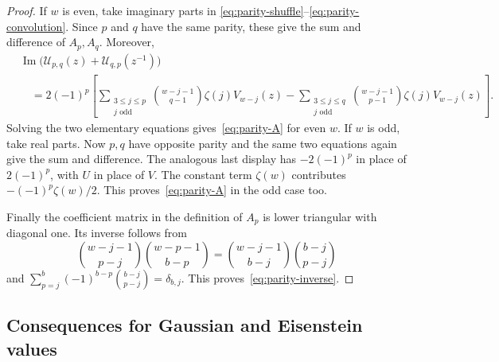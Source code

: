 \begin{proof}
If $w$ is even, take imaginary parts in
\eqref{eq:parity-shuffle}--\eqref{eq:parity-convolution}. Since $p$ and $q$
have the same parity, these give the sum and difference of $A_p,A_q$.
Moreover,
\begin{align*}
 &\operatorname{Im}\bigl(\mathcal U_{p,q}(z)+
                         \mathcal U_{q,p}(z^{-1})\bigr)\\
 &\quad=2(-1)^p\left[
  \sum_{\substack{3\le j\le p\\j\text{ odd}}}
       \binom{w-j-1}{q-1}\zeta(j)V_{w-j}(z)
 -\sum_{\substack{3\le j\le q\\j\text{ odd}}}
       \binom{w-j-1}{p-1}\zeta(j)V_{w-j}(z)\right].
\end{align*}
Solving the two elementary equations gives~\eqref{eq:parity-A} for even
$w$. If $w$ is odd, take real parts. Now $p,q$ have opposite parity and
the same two equations again give the sum and difference. The analogous
last display has $-2(-1)^p$ in place of $2(-1)^p$, with $U$ in place of
$V$. The constant term $\zeta(w)$ contributes
$-(-1)^p\zeta(w)/2$. This proves~\eqref{eq:parity-A} in the odd case too.

Finally the coefficient matrix in the definition of $A_p$ is lower
triangular with diagonal one. Its inverse follows from
\[
 \binom{w-j-1}{p-j}\binom{w-p-1}{b-p}
 =\binom{w-j-1}{b-j}\binom{b-j}{p-j}
\]
and $\sum_{p=j}^{b}(-1)^{b-p}\binom{b-j}{p-j}=\delta_{b,j}$.
This proves~\eqref{eq:parity-inverse}.
\end{proof}

\subsection{Consequences for Gaussian and Eisenstein values}
\label{subsec:gaussian-doubles}


